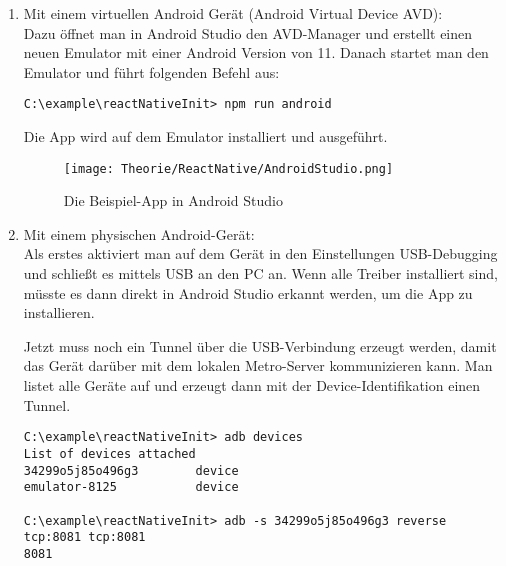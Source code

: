 \begin{enumerate}
  \item Mit einem virtuellen Android Gerät (Android Virtual Device AVD):\\
Dazu öffnet man in Android Studio den AVD-Manager und erstellt einen neuen Emulator mit einer
Android Version von 11. Danach startet man den Emulator und führt folgenden Befehl aus:

\begin{lstlisting}
C:\example\reactNativeInit> npm run android
\end{lstlisting}

Die App wird auf dem Emulator installiert und ausgeführt.

\begin{figure}[H]
  \begin{center}
    \texttt{[image: Theorie/ReactNative/AndroidStudio.png]}
    \caption{Die Beispiel-App in Android Studio}
  \end{center}
\end{figure}

  \item Mit einem physischen Android-Gerät:\\
Als erstes aktiviert man auf dem Gerät in den Einstellungen USB-Debugging und schließt es mittels
USB an den PC an. Wenn alle Treiber installiert sind, müsste es dann direkt in Android Studio
erkannt werden, um die App zu installieren.

Jetzt muss noch ein Tunnel über die USB-Verbindung erzeugt werden, damit das Gerät darüber mit dem
lokalen Metro-Server kommunizieren kann. Man listet alle Geräte auf und erzeugt dann mit der
Device-Identifikation einen Tunnel.

\begin{lstlisting}
C:\example\reactNativeInit> adb devices
List of devices attached
34299o5j85o496g3        device
emulator-8125           device

C:\example\reactNativeInit> adb -s 34299o5j85o496g3 reverse tcp:8081 tcp:8081
8081
\end{lstlisting}

\end{enumerate}